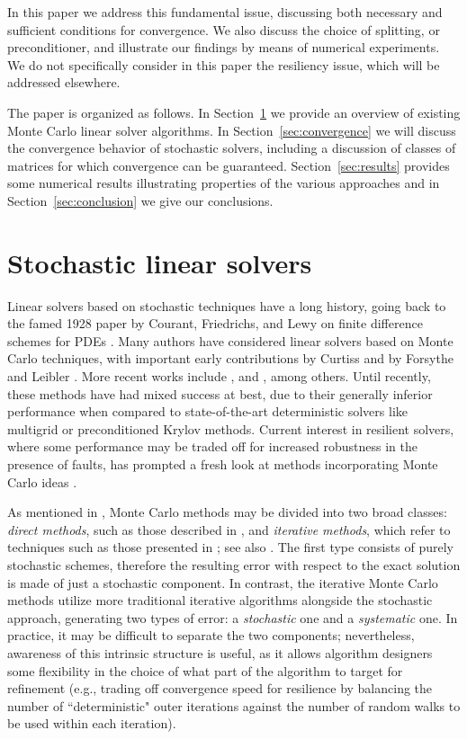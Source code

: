 \documentclass[final,leqno,onefignum,onetabnum]{siamltex1213}
\begin{document}
In this paper we address this fundamental issue,
discussing both necessary and sufficient conditions for convergence.
We also discuss the choice of splitting, or preconditioner, and illustrate
our findings by means of numerical experiments. 
We do not specifically
consider in this paper the resiliency issue, which will be addressed 
elsewhere. 

The paper is organized as follows.
In Section~\ref{sec:mcls} we provide an overview of existing Monte Carlo
linear solver algorithms.
In Section~\ref{sec:convergence} we will discuss the convergence behavior
of stochastic solvers, including a discussion of classes of matrices for
which convergence can be guaranteed.
Section~\ref{sec:results} provides some numerical results illustrating
properties of the various approaches and in Section~\ref{sec:conclusion} we
give our conclusions.


\section{Stochastic linear solvers}
\label{sec:mcls}

Linear solvers based on stochastic techniques have a
long history, 
going back to the famed 1928 paper by Courant, Friedrichs, and Lewy
on finite difference schemes for PDEs \cite{CFL}. 
Many authors have considered linear solvers based on Monte Carlo
techniques, with important early contributions by
Curtiss \cite{Curtiss} and by Forsythe and Leibler \cite{FL50}. 
More recent works include \cite{AADBTW2005,Hal1994},
and \cite{DA1998}, among others.
Until recently, 
these methods have had mixed success at best,
due to their generally inferior performance when compared to state-of-the-art
deterministic solvers like multigrid or preconditioned Krylov methods.
Current interest in resilient solvers, where some performance may be
traded off for increased robustness in the presence of faults, has prompted a fresh 
look at methods incorporating Monte Carlo ideas 
\cite{EMSH2014,ESW2013,Slattery2013}.

As mentioned in \cite{DA1998}, Monte Carlo methods may be divided into two broad
classes: \textit{direct methods}, such as those described in \cite{DA1998,DVA2001}, and
\textit{iterative methods}, which refer to techniques such as those presented
in \cite{Hal1962,Hal1994}; see also \cite{EMSH2014,ESW2013}.
The first type consists of purely stochastic schemes,
therefore the resulting error with respect to the exact solution is made of
just a stochastic component. In contrast, the iterative Monte Carlo methods utilize more
traditional iterative algorithms alongside the stochastic approach,
generating two types of error: a
\textit{stochastic} one and a \textit{systematic} one. 
In practice, it may be difficult to separate the two components;
nevertheless, awareness of this intrinsic structure is useful, as it allows 
algorithm designers some flexibility in the choice of what part of the algorithm
to target for refinement (e.g., trading off convergence speed for resilience by
balancing the number of ``deterministic" outer iterations
against the number of random walks to be used within each iteration).
\end{document}
